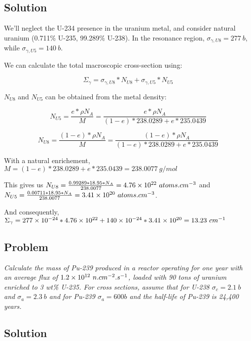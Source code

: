 \subsection{Solution}

We'll neglect the U-234 presence in the uranium metal, and consider natural uranium (0.711\% U-235, 99.289\% U-238). In the resonance region, $\sigma_{\gamma, U8} = 277\ b$, while $\sigma_{\gamma, U5} = 140\ b$.

We can calculate the total macroscopic cross-section using:

\begin{equation}
\Sigma_{\gamma} = \sigma_{\gamma, U8} * N_{U8} + \sigma_{\gamma, U5} * N_{U5}
\end{equation}

$N_{U8}$ and $N_{U5}$ can be obtained from the metal density:

\begin{equation}
N_{U5} = \frac{e*\rho N_A}{M} = \frac{e*\rho N_A}{(1-e)*238.0289 + e*235.0439}
\end{equation}

\begin{equation}
N_{U8} = \frac{(1-e)*\rho N_A}{M} = \frac{(1-e)*\rho N_A}{(1-e)*238.0289 + e*235.0439}
\end{equation}

With a natural enrichement, $M = (1-e)*238.0289 + e*235.0439 = 238.0077\ g/mol$

This gives us $N_{U8} = \frac{0.99289 * 18.95 * N_A}{238.0077} = \text{\num{4.76e22}}\ atoms.cm^{-3}$ and $N_{U5} = \frac{0.00711 * 18.95 * N_A}{238.0077} = \text{\num{3.41e20}}\ atoms.cm^{-3}$.

And consequently, $\Sigma_{\gamma} = \text{\num{277e-24}} * \text{\num{4.76e22}} + \text{\num{140e-24}} * \text{\num{3.41e20}} = 13.23\ cm^{-1}$


\subsection{Problem}
\textit{Calculate the mass of Pu-239 produced in a reactor operating for one year with an average flux of $\text{\num{1.2e12}}\ n.cm^{-2}.s^{-1}$, loaded with 90 tons of uranium enriched to 3 wt\% U-235. For
cross sections, assume that for U-238 $\sigma_c = 2.1\ b$ and $\sigma_a = 2.3\ b$ and for Pu-239 $\sigma_a = 600 b$ and the half-life of Pu-239 is 24,400 years.}

\subsection{Solution}

